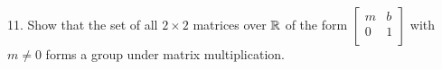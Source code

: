 \begin{mdframed}[style=darkAnswer,frametitle={Joe Starr}]
\begin{itemize}[align=left]
{    }

  \end{itemize}
\end{mdframed}
\newpage
\begin{mdframed}[style=darkQuesion]
  11. Show that the set of all $2\times 2$ matrices over $\mathbb{R}$ of the form
  $\begin{bmatrix}
      m & b \\
      0 & 1 \\
    \end{bmatrix}$ with $m\neq 0$ forms a group under matrix multiplication.
\end{mdframed}

